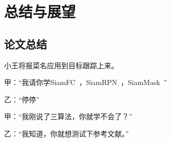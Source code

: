 \chapter{总结与展望}

\section{论文总结}
小王将报菜名应用到目标跟踪上来。

甲：“我请你学SiamFC~\cite{SiamFC}，SiamRPN~\cite{SiamRPN}，SiamMask~\cite{SiamMask}”

乙：“停停”

甲：“我刚说了三算法，你就学不会了？”

乙：“我知道，你就想测试下参考文献。”